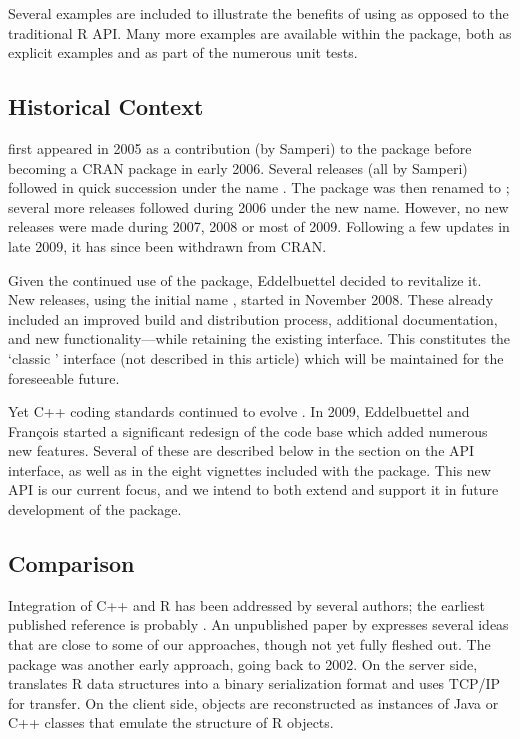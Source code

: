 Several examples are included to illustrate the benefits of using 
as opposed to the traditional R API. Many more examples are available within
the package, both as explicit examples and as part of the numerous unit tests.

\subsection{Historical Context}

 first appeared in 2005 as a contribution (by Samperi) to the
 package \citep{cran:rquantlib} before becoming a CRAN package
in early 2006. Several releases (all by Samperi) followed in quick succession
under the name . The package was then renamed to
; several more releases followed during 2006 under the new
name.  However, no new releases were made during 2007, 2008 or most of
2009. Following a few updates in late 2009, it has since been withdrawn from CRAN.

Given the continued use of the package, Eddelbuettel decided to revitalize it. New
releases, using the initial name , started in November 2008. These
already included an improved build and distribution process, additional
documentation, and new functionality---while retaining the existing
interface.  This constitutes the `classic ' interface 
(not described in this article) which will be maintained for the foreseeable future.

Yet C++ coding standards continued to evolve \citep{meyers:effectivecplusplus}.
In 2009, Eddelbuettel and Fran\c{c}ois started a significant redesign of the
code base which added numerous new features.  Several of these are described
below in the section on the  API interface, as well as in the
eight vignettes included with the package. This new API is our current focus,
and we intend to both extend and support it in future development of the
package. 

\subsection{Comparison}

Integration of C++ and R has been addressed by several authors; the earliest
published reference is probably \cite{batesdebroy01:cppclasses}.
An unpublished paper by \cite{javagailemanly07:r_cpp} expresses several ideas
that are close to some of our approaches, though not yet fully fleshed out.
%
The  package \citep{urbanek2003:rserve,cran:Rserve} was another early approach,
going back to 2002. On the server side,  translates R data
structures into a binary serialization format and uses TCP/IP for
transfer. On the client side, objects are reconstructed as instances of Java
or C++ classes that emulate the structure of R objects. 

